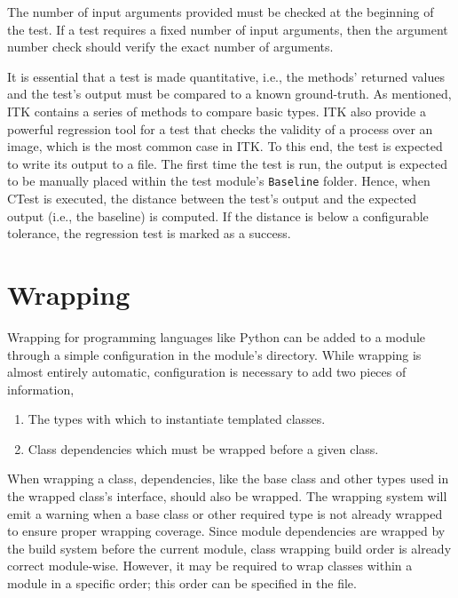 The number of input arguments provided must be checked at the beginning of the
test. If a test requires a fixed number of input arguments, then the argument
number check should verify the exact number of arguments.

It is essential that a test is made quantitative, i.e., the methods' returned
values and the test's output must be compared to a known ground-truth. As
mentioned, ITK contains a series of methods to compare basic types. ITK also
provide a powerful regression tool for a test that checks the validity of a
process over an image, which is the most common case in ITK. To this end, the
test is expected to write its output to a file. The first time the test is run,
the output is expected to be manually placed within the test module's
\texttt{Baseline} folder. Hence, when CTest is executed, the distance between
the test's output and the expected output (i.e., the baseline) is computed. If
the distance is below a configurable tolerance, the regression test is marked as
a success.

\section{Wrapping}
\label{sec:ModuleWrapping}

Wrapping for programming languages like Python can be added to a module
through a simple configuration in the module's  directory.
While wrapping is almost entirely automatic, configuration is necessary
to add two pieces of information,

\begin{enumerate}
  \item The types with which to instantiate templated classes.
  \item Class dependencies which must be wrapped before a given class.
\end{enumerate}

When wrapping a class, dependencies, like the base class and other types used
in the wrapped class's interface, should also be wrapped. The wrapping system
will emit a warning when a base class or other required type is not already
wrapped to ensure proper wrapping coverage. Since module dependencies are
wrapped by the build system before the current module, class wrapping
build order is already correct module-wise. However, it may be required to
wrap classes within a module in a specific order; this order can be specified
in the  file.

